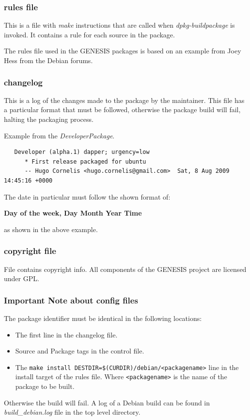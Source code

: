 \documentclass[12pt]{article}
\begin{document}
\subsubsection*{rules file}

This is a file with {\it make} instructions that are called when {\it dpkg-buildpackage} is invoked. It contains a rule for each source in the package.

The rules file used in the GENESIS packages is based on an example from Joey Hess from the Debian forums.

\subsubsection*{changelog}

This is a log of the changes made to the package by the maintainer. This file has a particular format that must be followed, otherwise the package build will fail, halting the packaging process.

Example from the {\it DeveloperPackage}.
\begin{verbatim}
   Developer (alpha.1) dapper; urgency=low
      * First release packaged for ubuntu
      -- Hugo Cornelis <hugo.cornelis@gmail.com>  Sat, 8 Aug 2009 14:45:16 +0000
\end{verbatim}

The date in particular must follow the shown format of:

    {\bf Day of the week, Day Month Year Time} 

as shown in the above example.

\subsubsection*{copyright file}

File contains copyright info. All components of the GENESIS project are licensed under GPL.

\subsubsection*{Important Note about config files}

The package identifier must be identical in the following locations:
\begin{itemize}
   \item The first line in the changelog file.
   \item Source and Package tags in the control file.
   \item The {\tt make install DESTDIR=\$(CURDIR)/debian/<packagename>} line in the install target of the rules file. Where {\tt <packagename>} is the name of the package to be built. 
\end{itemize}
Otherwise the build will fail. A log of a Debian build can be found in {\it build\_debian.log} file in the top level directory.
\end{document}
